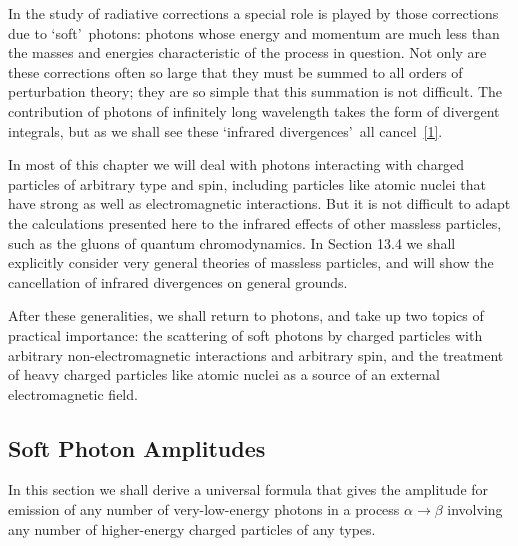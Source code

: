 
In the study of radiative corrections a special role is played by those
corrections due to \lq soft\rq\ photons: photons whose energy and momentum
are much less than the masses and energies characteristic of the process
in question. Not only are these corrections often so large that they must
be summed to all orders of perturbation theory; they are so simple that
this summation is not difficult. The contribution of photons of infinitely
long wavelength takes the form of divergent integrals, but as we shall see
these \lq infrared divergences\rq\ all cancel~\hyperref[ref:13.1]{[1]}.

In most of this chapter we will deal with photons interacting with
charged particles of arbitrary type and spin, including particles like atomic
nuclei that have strong as well as electromagnetic interactions. But it is not
difficult to adapt the calculations presented here to the infrared effects of
other massless particles, such as the gluons of quantum chromodynamics.
In Section 13.4 we shall explicitly consider very general theories of massless
particles, and will show the cancellation of infrared divergences on general
grounds.

After these generalities, we shall return to photons, and take up two
topics of practical importance: the scattering of soft photons by charged
particles with arbitrary non-electromagnetic interactions and arbitrary
spin, and the treatment of heavy charged particles like atomic nuclei as a
source of an external electromagnetic field.

\subsection{Soft Photon Amplitudes}

In this section we shall derive a universal formula that gives the amplitude
for emission of any number of very-low-energy photons in a process
$\alpha\to\beta$ involving any number of higher-energy charged particles of
any types.

